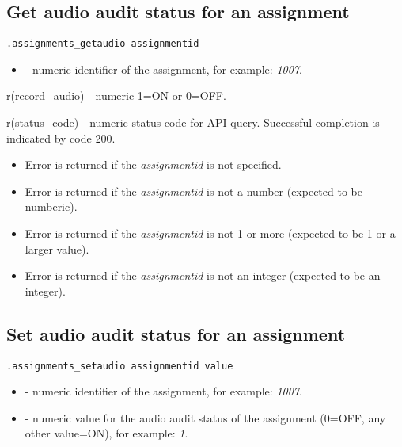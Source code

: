 \subsection{Get audio audit status for an assignment}

\begin{lstlisting}[style=CommandLineStyle]
.assignments_getaudio assignmentid
\end{lstlisting}

\paramsheader
\begin{itemize}
    \item {} - numeric identifier of the assignment, for example: \textit{1007}.
\end{itemize}

\savedres
\begin{compactitem}
    \item r(record\_audio) - numeric 1=ON or 0=OFF.
    \item r(status\_code)  - numeric status code for API query. Successful completion is indicated by code 200.
\end{compactitem}

\errheader
\begin{itemize}
    \item Error  is returned if the \textit{assignmentid} is not specified.
    \item Error  is returned if the \textit{assignmentid} is not a number (expected to be numberic).
    \item Error  is returned if the \textit{assignmentid} is not 1 or more (expected to be 1 or a larger value).
    \item Error  is returned if the \textit{assignmentid} is not an integer (expected to be an integer).
\end{itemize}

\subsection{Set audio audit status for an assignment}

\begin{lstlisting}[style=CommandLineStyle]
.assignments_setaudio assignmentid value
\end{lstlisting}

\paramsheader
\begin{itemize}
    \item {} - numeric identifier of the assignment, for example: \textit{1007}.
    \item {} - numeric value for the audio audit status of the assignment (0=OFF, any other value=ON), for example: \textit{1}.

\end{itemize}

